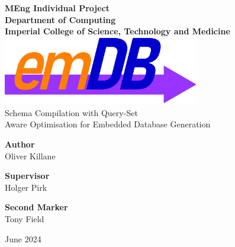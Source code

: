 
\newcommand{\titlecredit}[2]{\begin{minipage}[t]{.3\textwidth}
        \Large
        \centering
        \textbf{#1}
        \\ \vspace{1mm} #2
    \end{minipage}}


\begin{titlepage}
    \begin{center}
        \vspace{4cm}
        \Huge
        \textbf{MEng Individual Project}
        \huge
        \\ \vspace{1mm}
        \textbf{Department of Computing}
        \normalsize
        \\ \vspace{5mm}
        \textbf{Imperial College of Science, Technology and Medicine}
        \\ \vspace{30mm}
        \includegraphics[height=30mm]{titlepage/images/emdb_logo.png}
        \\ \HUGE Schema Compilation with Query-Set \\ Aware Optimisation for Embedded Database Generation
        \vspace{35mm}
        \normalsize
        \\ \vspace{3cm}
        \begin{center}
            \titlecredit{Author}{Oliver Killane}
            \titlecredit{Supervisor}{Holger Pirk}
            \titlecredit{Second Marker}{Tony Field}
        \end{center}
        \vspace{5mm}
         June 2024
    \end{center}
\end{titlepage}